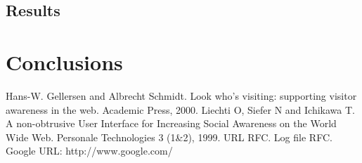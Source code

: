 \documentclass[a4paper]{danarticle}
\begin{document}
    \subsection{Results}
      
      
  \section{Conclusions}
  
  \begin{thebibliography}{99}
     Hans-W. Gellersen and Albrecht Schmidt.
    Look who's visiting: supporting visitor awareness in the web.
    Academic Press, 2000.
     Liechti O, Siefer N and Ichikawa T.
    A non-obtrusive User Interface for Increasing Social Awareness on the 
    World Wide Web. Personale Technologies 3 (1\&2), 1999.
     URL RFC.
     Log file RFC.
     Google URL: http://www.google.com/
  \end{thebibliography}
\end{document}
